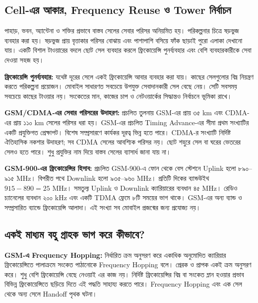 \subsection{Cell-এর আকার, Frequency Reuse ও Tower নির্বাচন}
পাহাড়, ভবন, অ্যান্টেনা ও শক্তির প্রভাবে বাস্তব সেলের সেবার পরিসর অনিয়মিত হয়। পরিকল্পনার চিত্রে ষড়ভুজ ব্যবহার করা হয়। ষড়ভুজ প্রায় বৃত্তাকার পরিসর বোঝায় এবং পাশাপাশি বসিয়ে ফাঁক ছাড়াই পুরো এলাকা দেখানো যায়। একটি বিশাল টাওয়ারের বদলে ছোট সেল ব্যবহার করলে ফ্রিকোয়েন্সি পুনর্ব্যবহার এবং বেশি ব্যবহারকারীকে সেবা দেওয়া সহজ হয়।

\textbf{ফ্রিকোয়েন্সি পুনর্ব্যবহার:} যথেষ্ট দূরের সেলে একই ফ্রিকোয়েন্সি আবার ব্যবহার করা যায়। কাছের সেলগুলোর বিঘ্ন নিয়ন্ত্রণ করতে পরিকল্পনা প্রয়োজন। মোবাইল সাধারণত সবচেয়ে উপযুক্ত সেবাদানকারী সেল বেছে নেয়। সেটি সবসময় সবচেয়ে কাছের টাওয়ার নয়। সংকেতের মান, কাজের চাপ ও নেটওয়ার্কের সিদ্ধান্তও নির্বাচনে ভূমিকা রাখে।

\textbf{GSM/CDMA-এর সেবার পরিসরের উদাহরণ:} প্রচলিত তুলনায় GSM-এর প্রায় ৩৫ km এবং CDMA-এর প্রায় ১১০ km সেলের পরিসর ধরা হয়। GSM-এর প্রচলিত Timing Advance-এর সীমা প্রথম সংখ্যাটির একটি প্রযুক্তিগত প্রেক্ষাপট। বিশেষ সম্প্রসারণে কার্যকর দূরত্ব ভিন্ন হতে পারে। CDMA-র সংখ্যাটি নির্দিষ্ট ঐতিহাসিক নকশার উদাহরণ; সব CDMA সেলের আবশ্যিক পরিসর নয়। ছোট শহুরে সেল বা ঘরের ভেতরের সেলও হতে পারে। শুধু প্রযুক্তির নাম দিয়ে বাস্তব সেলের ব্যাসার্ধ জানা যায় না।

\textbf{GSM-900-এর ফ্রিকোয়েন্সির হিসাব:} প্রচলিত GSM-900-এ ফোন থেকে বেস স্টেশনে Uplink হলো ৮৯০–৯১৫ MHz। বিপরীত পথে Downlink হলো ৯৩৫–৯৬০ MHz। প্রতিটি দিকের ব্যান্ডউইথ $915-890=25$ MHz। সমতুল্য Uplink ও Downlink ক্যারিয়ারের ব্যবধান ৪৫ MHz। রেডিও চ্যানেলের ব্যবধান ২০০ kHz এবং একটি TDMA ফ্রেমে ৮টি সময়ের ভাগ থাকে। GSM-এর অন্য ব্যান্ড ও সম্প্রসারিত ব্যান্ডে ফ্রিকোয়েন্সি আলাদা। এই সংখ্যা সব মোবাইল প্রজন্মের জন্য প্রযোজ্য নয়।

\subsection{একই মাধ্যম বহু গ্রাহক ভাগ করে কীভাবে?}
\textbf{GSM-এ Frequency Hopping:} নির্ধারিত ক্রম অনুসরণ করে একাধিক অনুমোদিত ক্যারিয়ার ফ্রিকোয়েন্সিতে পালাক্রমে সংকেত পাঠানোকে Frequency Hopping বলে। প্রেরক ও প্রাপক একই ক্রম অনুসরণ করে। শুধু বেশি ফ্রিকোয়েন্সি বেছে নেওয়াই এর কাজ নয়। নির্দিষ্ট ফ্রিকোয়েন্সির বিঘ্ন বা সংকেত ম্লান হওয়ার প্রভাব বিভিন্ন ফ্রিকোয়েন্সিতে ছড়িয়ে দিতে এই পদ্ধতি সাহায্য করতে পারে। Frequency Hopping এবং এক সেল থেকে অন্য সেলে Handoff পৃথক ঘটনা।

